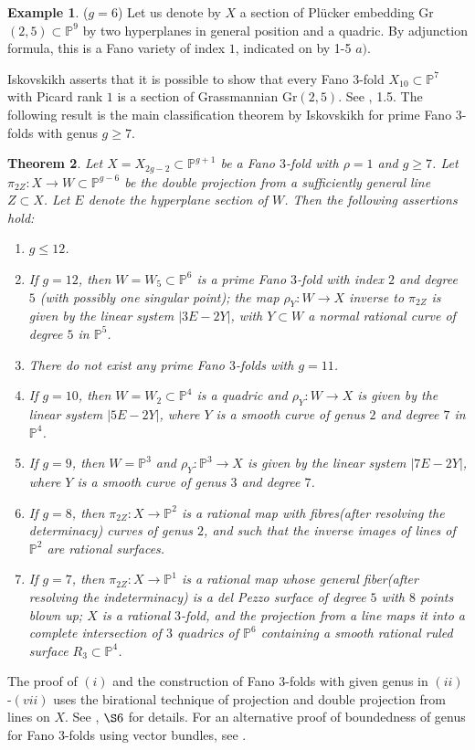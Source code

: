 \documentclass[11pt]{amsart}
\theoremstyle{plain}
\newtheorem{theorem}{Theorem}[section]
\theoremstyle{definition}
\newtheorem{example}[theorem]{Example}
\theoremstyle{expl}
\begin{document}
\begin{example}
        ($g=6$) Let us denote by $X$ a section of Pl\"{u}cker embedding Gr$(2,5) \subset \mathbb{P}^9$ by two hyperplanes in general position and a quadric. By adjunction formula, this is a Fano variety of index $1$, indicated on \cite{Fano} by 1-5 $a)$.
\end{example}
Iskovskikh asserts that it is possible to show that every Fano $3$-fold $X_{10} \subset \mathbb{P}^7$ with Picard rank $1$ is a section of Grassmannian Gr$(2,5)$. See \cite{Isk78}, 1.5.
\medbreak
The following result is the main classification theorem by Iskovskikh for prime Fano $3$-folds with genus $g\geq 7$.
\begin{theorem}
    Let $X = X_{2g-2} \subset \mathbb{P}^{g+1}$ be a Fano $3$-fold with $\rho =1$ and $g\geq 7$. %
    Let $\pi_{2Z}: X \to W \subset \mathbb{P}^{g-6}$ be the double projection from a sufficiently general line $Z \subset X$. Let $E$ denote the hyperplane section of $W$. Then the following assertions hold:
    \begin{enumerate}
        \item[(i)] $g \leq 12$. 
        \item[(ii)] If $g=12$, then $W=W_5 \subset \mathbb{P}^6$ is a prime Fano $3$-fold with index $2$ and degree $5$ (with possibly one singular point); the map $\rho_Y :W \to X$ inverse to $\pi_{2Z}$ is given by the linear system $|3E-2Y|$, with $Y \subset W$ a normal rational curve of degree $5$ in $\mathbb{P}^5$.
        \item[(iii)] There do not exist any prime Fano $3$-folds with $g=11$. 
        \item[(iv)] If $g=10$, then $W= W_2 \subset \mathbb{P}^4$ is a quadric and $\rho_Y : W \to X$ is given by the linear system $|5E-2Y|$, where $Y$ is a smooth curve of genus $2$ and degree $7$ in $\mathbb{P}^4$.
        \item[(v)] If $g=9$, then $W= \mathbb{P}^3$ and $\rho_Y : \mathbb{P}^3 \to X$ is given by the linear system $|7E-2Y|$, where $Y$ is a smooth curve of genus $3$ and degree $7$.
        \item[(vi)] If $g=8$, then $\pi_{2Z}: X \to \mathbb{P}^2$ is a rational map with fibres(after resolving the determinacy) curves of genus $2$, and such that the inverse images of lines of $\mathbb{P}^2$ are rational surfaces.
        \item[(vii)] If $g=7$, then $\pi_{2Z}: X \to \mathbb{P}^1$ is a rational map whose general fiber(after resolving the indeterminacy) is a del Pezzo surface of degree $5$ with $8$ points blown up; $X$ is a rational $3$-fold, and the projection from a line maps it into a complete intersection of $3$ quadrics of $\mathbb{P}^6$ containing a smooth rational ruled surface $R_3 \subset \mathbb{P}^4$.
        \end{enumerate}
\end{theorem}
The proof of $(i)$ and the construction of Fano $3$-folds with given genus in $(ii)$-$(vii)$ uses the birational technique of projection and double projection from lines on $X$. See \cite{Isk78}, $\S 6$ for details.
For an alternative proof of boundedness of genus for Fano $3$-folds using vector bundles, see \cite{Muk92}.
	    
\end{document}

